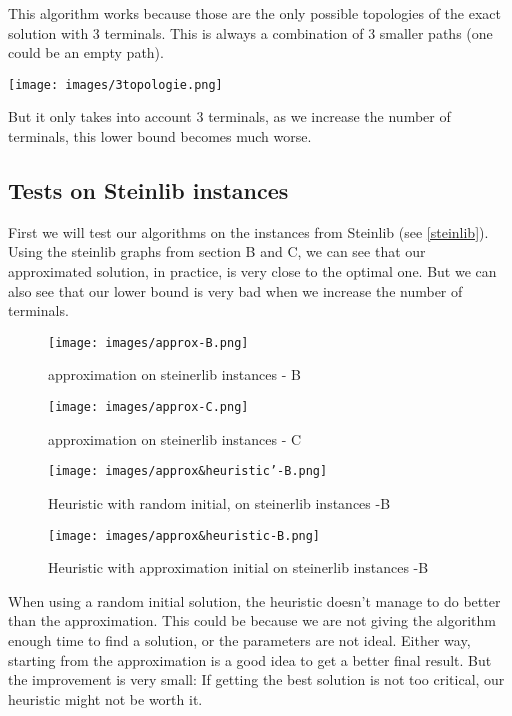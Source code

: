 \documentclass{article}
\begin{document}
This algorithm works because those are the only possible topologies of the exact solution with 3 terminals. This is always a combination of 3 smaller paths (one could be an empty path).

\begin{center}
\texttt{[image: images/3topologie.png]}
\end{center}

But it only takes into account 3 terminals, as we increase the number of terminals, this lower bound becomes much worse.
\subsection{Tests on Steinlib instances}
First we will test our algorithms on the instances from Steinlib (see \ref{steinlib}).
Using the steinlib graphs from section B and C, we can see that our approximated solution, in practice, is very close to the optimal one. But we can also see that our lower bound is very bad when we increase the number of terminals.
\begin{figure}
    \centering
    \texttt{[image: images/approx-B.png]}
    \caption{approximation on steinerlib instances - B}
\end{figure}
\begin{figure}
    \centering
    \texttt{[image: images/approx-C.png]}
    \caption{approximation on steinerlib instances - C}
\end{figure}

\begin{figure}
\centering
    \texttt{[image: images/approx\&heuristic'-B.png]}
    \caption{Heuristic with random initial, on steinerlib instances -B}
\end{figure}

\begin{figure}
\centering
    \texttt{[image: images/approx\&heuristic-B.png]}
    \caption{Heuristic with approximation initial on steinerlib instances -B}
\end{figure}
\newpage
When using a random initial solution, the heuristic doesn't manage to do better than the approximation. This could be because we are not giving the algorithm enough time to find a solution, or the parameters are not ideal. Either way, starting from the approximation is a good idea to get a better final result. But the improvement is very small: If getting the best solution is not too critical, our heuristic might not be worth it.
\end{document}
